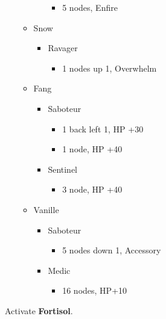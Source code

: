 \begin{multicols}{2}
\begin{menu}
\begin{itemize}
\begin{itemize}
\begin{itemize}
					            \begin{itemize}
						            \item 5 nodes, Enfire
					            \end{itemize}
				      \end{itemize}
				\item Snow
				      \begin{itemize}
					      \item Ravager
					            \begin{itemize}
						            \item 1 nodes up 1, Overwhelm
					            \end{itemize}
				      \end{itemize}
				\item Fang
				      \begin{itemize}
					      \item Saboteur
					            \begin{itemize}
						            \item 1 back left 1, HP +30
						            \item 1 node, HP +40
					            \end{itemize}
					      \item Sentinel
					            \begin{itemize}
						            \item 3 node, HP +40
					            \end{itemize}
				      \end{itemize}
				\item Vanille
				      \begin{itemize}
					      \item Saboteur
					            \begin{itemize}
						            \item 5 nodes down 1, Accessory
					            \end{itemize}
					      \item Medic
					            \begin{itemize}
						            \item 16 nodes, HP+10
					            \end{itemize}
				      \end{itemize}
			\end{itemize}

		\end{itemize}
	\end{menu}
	 Activate \textbf{Fortisol}.

\end{multicols}
